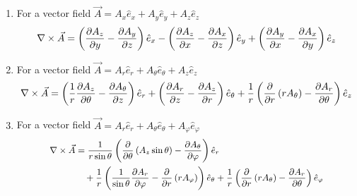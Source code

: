 \documentclass[11pt,]{beamer}
\begin{document}
\begin{frame}
	\begin{enumerate}
	\item For a vector field $\vec{A} = A_x \hat{e}_x + A_y \hat{e}_y + A_z \hat{e}_z$
		\begin{equation}\small
		\nabla\times\vec{A} = 
		\left(\frac{\partial A_z}{\partial y} - \frac{\partial A_y}{\partial z}\right)\hat{e}_x
		- \left(\frac{\partial A_z}{\partial x}  - \frac{\partial A_x}{\partial z}\right)\hat{e}_y
		+ \left(\frac{\partial A_y}{\partial x}  - \frac{\partial A_x}{\partial y}\right)\hat{e}_z
		\end{equation}
	
	\item For a vector field $\vec{A} = A_r \hat{e}_r + A_\theta \hat{e}_\theta + A_z \hat{e}_z$
		\begin{equation}\small
		\nabla \times \vec{A} =
		\left(\frac {1}{r}\frac{\partial A_z}{\partial \theta}
			-\frac{\partial A_\theta}{\partial z}\right) \hat{e}_r
		+\left(\frac {\partial A_r}{\partial z}
			-\frac {\partial A_z}{\partial r}\right) \hat{e}_\theta
		+\frac{1}{r}\left(\frac {\partial}{\partial r}\left(r A_\theta\right)
			-\frac{\partial A_r}{\partial \theta}\right)\hat{e}_z
		\end{equation}

	\item For a vector field $\vec{A} = A_r \hat{e}_r + A_\theta \hat{e}_\theta + A_\varphi \hat{e}_\varphi$
		\begin{equation}\small
		\begin{aligned}
		\nabla\times\vec{A} &=
		\frac{1}{r\sin\theta}\left(\frac{\partial}{\partial \theta}\left(A_z \sin\theta\right)
			-\frac{\partial A_\theta}{\partial \varphi}\right)\hat{e}_r\\
		&\quad + \frac{1}{r}\left(\frac{1}{\sin\theta}\frac{\partial A_r}{\partial \varphi} 
			- \frac{\partial}{\partial r}\left(rA_{\varphi}\right)\right)\hat{e}_\theta
		+ \frac{1}{r}\left(\frac{\partial}{\partial r}\left(r A_\theta\right)
			- \frac{\partial A_{r}}{\partial \theta}\right)\hat{e}_\varphi
		\end{aligned}
		\end{equation}
	\end{enumerate}
\end{frame}
\end{document}

